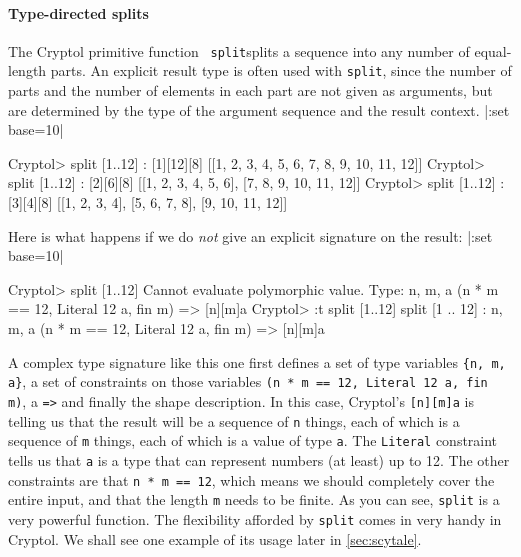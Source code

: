 \paragraph*{Type-directed splits} The Cryptol primitive function {\tt
  split}\indSplit splits a sequence into any number of equal-length
parts. An explicit result type is often used with {\tt split}, since
the number of parts and the number of elements in each part are not
given as arguments, but are determined by the type of the argument
sequence and the result context.
\restartrepl
\hidereplin|:set base=10|
\begin{replPrompt}
  Cryptol> split [1..12] : [1][12][8]
  [[1, 2, 3, 4, 5, 6, 7, 8, 9, 10, 11, 12]]
  Cryptol> split [1..12] : [2][6][8]
  [[1, 2, 3, 4, 5, 6], [7, 8, 9, 10, 11, 12]]
  Cryptol> split [1..12] : [3][4][8]
  [[1, 2, 3, 4], [5, 6, 7, 8], [9, 10, 11, 12]]
\end{replPrompt}
Here is what happens if we do {\em not} give an explicit signature on
the result:\indSignature
\restartrepl
\hidereplin|:set base=10|
\begin{replPrompt}
  Cryptol> split [1..12]
  Cannot evaluate polymorphic value.
  Type: {n, m, a} (n * m == 12, Literal 12 a, fin m) => [n][m]a
  Cryptol> :t split [1..12]
  split [1 .. 12] : {n, m, a} (n * m == 12, Literal 12 a, fin m) =>
                      [n][m]a
\end{replPrompt}

A complex type signature like this one first defines a set of type
variables \verb|{n, m, a}|, a set of constraints on those variables
\verb|(n * m == 12, Literal 12 a, fin m)|, a \texttt{=>} and finally
the shape description. In this case, Cryptol's \texttt{[n][m]a} is
telling us that the result will be a sequence of \texttt{n} things,
each of which is a sequence of \texttt{m} things, each of which is a
value of type \texttt{a}. The \texttt{Literal} constraint tells us
that \texttt{a} is a type that can represent numbers (at least) up to
12. The other constraints are that \texttt{n * m == 12}, which means
we should completely cover the entire input, and that the length
\texttt{m} needs to be finite. As you can see, \texttt{split} is a
very powerful function. The flexibility afforded by \texttt{split}
comes in very handy in Cryptol. We shall see one example of its usage
later in \autoref{sec:scytale}.

